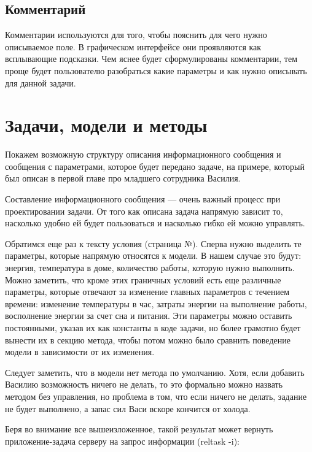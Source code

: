 {{\subsection{Комментарий}

Комментарии используются для того, чтобы пояснить для чего нужно описываемое поле. В графическом интерфейсе они проявляются как всплывающие подсказки. Чем яснее будет сформулированы комментарии, тем проще будет пользователю разобраться какие параметры и как нужно описывать для данной задачи.

\section{Задачи, модели и методы}
Покажем возможную структуру описания информационного сообщения и сообщения с параметрами, которое будет передано задаче, на примере, который был описан в первой главе про младшего сотрудника Василия.

Составление информационного сообщения — очень важный процесс при проектировании задачи. От того как описана задача напрямую зависит то, насколько удобно ей будет пользоваться и насколько гибко ей можно управлять.

Обратимся еще раз к тексту условия (страница №). Сперва нужно выделить те параметры, которые напрямую относятся к модели. В нашем случае это будут: энергия, температура в доме, количество работы, которую нужно выполнить. Можно заметить, что кроме этих граничных условий есть еще различные параметры, которые отвечают за изменение главных параметров с течением времени: изменение температуры в час, затраты энергии на выполнение работы, восполнение энергии за счет сна и питания. 
Эти параметры можно оставить постоянными, указав их как константы в коде задачи, но более грамотно будет вынести их в секцию метода, чтобы потом можно было сравнить поведение модели в зависимости от их изменения.

Следует заметить, что в модели нет метода по умолчанию. Хотя, если добавить Василию возможность ничего не делать, то это формально можно назвать методом без управления, но проблема в том, что если ничего не делать, задание не будет выполнено, а запас сил Васи вскоре кончится от холода.

Беря во внимание все вышеизложенное, такой результат может вернуть приложение-задача серверу на запрос информации (reltask -i):

}}
